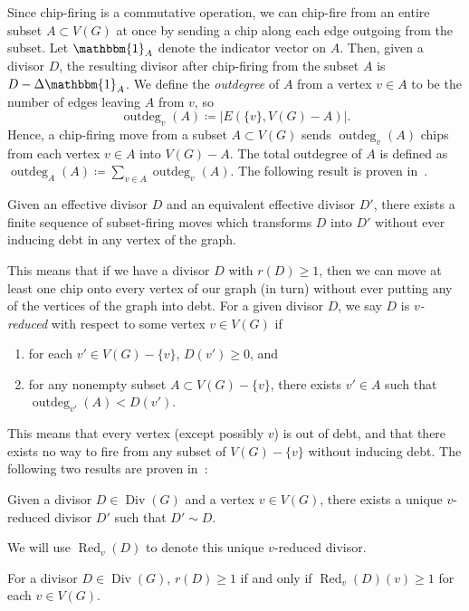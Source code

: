 \documentclass[ALCO,ThmDefs,Unicode,epreuves]{cedram}
\DeclareMathOperator{\Div}{Div}
\DeclareMathOperator{\outdeg}{outdeg}
\DeclareMathOperator{\Red}{Red}
\begin{document}
Since chip-firing is a commutative operation, we can chip-fire from an entire subset $A \subset V(G)$ at once by sending a chip along each edge outgoing from the subset. Let $\mathbbm{1}_A$ denote the indicator vector on $A$. Then, given a divisor $D$, the resulting divisor after chip-firing from the subset $A$ is $D - \Delta \mathbbm{1}_A$. We define the \emph{outdegree} of $A$ from a vertex $v \in A$ to be the number of edges leaving $A$ from $v$, so
\[
\outdeg _v(A) \coloneqq | E(\{v\}, V(G) - A) |.
\]
Hence, a chip-firing move from a subset $A \subset V(G)$ sends $\outdeg _v(A)$ chips from each vertex $v \in A$ into $V(G) - A$. The total outdegree of $A$ is defined as $\outdeg _A(A) \coloneqq \sum_{v \in A} \outdeg _v(A)$. The following result is proven in~\cite{db}.

\begin{lemma}
\label{lemma:finiteseq}
Given an effective divisor $D$ and an equivalent effective divisor $D'$, there exists a finite sequence of subset-firing moves which transforms $D$ into $D'$ without ever inducing debt in any vertex of the graph. 
\end{lemma}

This means that if we have a divisor $D$ with $r(D) \geq 1$, then we can move at least one chip onto every vertex of our graph (in turn) without ever putting any of the vertices of the graph into debt. For a given divisor $D$, we say $D$ is \emph{$v$-reduced} with respect to some vertex $v \in V(G)$ if
\begin{enumerate}
 \item\label{lemma2.1_1} for each $v' \in V(G) - \{v\}$, $D(v') \geq 0$, and
 \item\label{lemma2.1_2} for any nonempty subset $A \subset V(G) - \{v\}$, there exists $v' \in A$ such that $\outdeg _{v'}(A) < D(v')$.
\end{enumerate}
This means that every vertex (except possibly $v$) is out of debt, and that there exists no way to fire from any subset of $V(G) - \{v\}$ without inducing debt. The following two results are proven in~\cite{bn}:

\begin{lemma}
\label{lemma:uniquevred}
Given a divisor $D \in \Div (G)$ and a vertex $v \in V(G)$, there exists a unique $v$-reduced divisor $D'$ such that $D' \sim D$. 
\end{lemma}

We will use $\Red _{v}(D)$ to denote this unique $v$-reduced divisor. 

\begin{lemma}
\label{lemma:vredrank}
For a divisor $D \in \Div (G)$, $r(D) \geq 1$ if and only if $\Red _v(D)(v) \geq 1$ for each $v \in V(G)$. 
\end{lemma}
\end{document}
